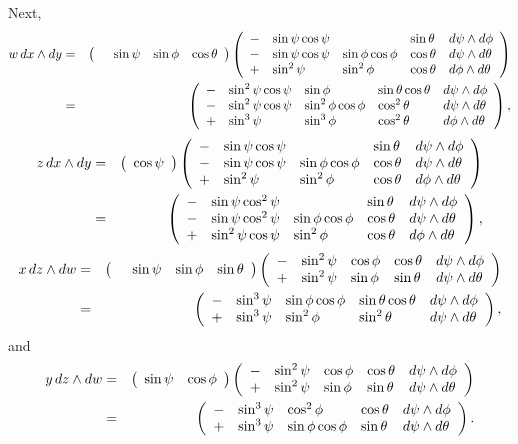 \documentclass[10pt]{article}
\numberwithin{equation}{subsection}
\begin{document}
Next,
\begin{eqnarray*}
	w\, dx\wedge dy &=&
		\left(\begin{array}{llllllllllll} 
			&\sin\psi &\sin\phi &\cos\theta
		 \end{array}\right)
		\left(\begin{array}{llllllllllll} 
			-& \sin\psi \cos\psi &                 &\sin\theta &d\psi\wedge d\phi \\
			-& \sin\psi \cos\psi &\sin\phi\cos\phi &\cos\theta &d\psi\wedge d\theta\\
			+& \sin^2\psi        &\sin^2\phi       &\cos\theta &d\phi\wedge d\theta
		 \end{array}\right) \\
	&=& \left(\begin{array}{llllllllllll} 
		-& \sin^2\psi \cos\psi & \sin\phi           &\sin\theta\cos\theta &d\psi\wedge d\phi \\
		-& \sin^2\psi \cos\psi & \sin^2\phi\cos\phi &\cos^2\theta         &d\psi\wedge d\theta \\
		+& \sin^3\psi          & \sin^3\phi         &\cos^2\theta         &d\phi\wedge d\theta
		 \end{array}\right),
\end{eqnarray*}
\begin{eqnarray*}
	z\, dx\wedge dy
	&=& \left(\begin{array}{llllllllllll} 
		\cos\psi
	 \end{array}\right)
	\left(\begin{array}{llllllllllll} 
		-& \sin\psi \cos\psi &                 &\sin\theta &d\psi \wedge d\phi \\
		-& \sin\psi \cos\psi &\sin\phi\cos\phi &\cos\theta &d\psi\wedge d\theta \\
		+& \sin^2\psi        &\sin^2\phi       &\cos\theta &d\phi\wedge d\theta
	 \end{array}\right) \\
	&=& \left(\begin{array}{llllllllllll} 
		-& \sin\psi\cos^2\psi &                 &\sin\theta &d\psi \wedge d\phi \\
		-& \sin\psi\cos^2\psi &\sin\phi\cos\phi &\cos\theta &d\psi\wedge d\theta \\
		+& \sin^2\psi\cos\psi &\sin^2\phi       &\cos\theta &d\phi\wedge d\theta
	 \end{array}\right),
\end{eqnarray*}
\begin{eqnarray*}
	x\,dz \wedge dw
	&=& \left(\begin{array}{llllllllllll} 
			&\sin\psi &\sin\phi &\sin\theta
		 \end{array}\right)
		\left(\begin{array}{llllllllllll} 
			-& \sin^2\psi &\cos\phi &\cos\theta &d\psi \wedge d\phi \\
			+& \sin^2\psi &\sin\phi &\sin\theta &d\psi \wedge d\theta
		 \end{array}\right) \\
	&=& \left(\begin{array}{llllllllllll} 
		-& \sin^3\psi &\sin\phi\cos\phi &\sin\theta\cos\theta &d\psi\wedge d\phi \\
		+& \sin^3\psi &\sin^2\phi       &\sin^2\theta         &d\psi \wedge d\theta
		 \end{array}\right),
\end{eqnarray*}
and
\begin{eqnarray*}
	y\, dz \wedge dw
	&=& \left(\begin{array}{llllllllllll} 
			\sin\psi&\cos\phi
		 \end{array}\right)
	\left(\begin{array}{llllllllllll} 
		-& \sin^2\psi &\cos\phi &\cos\theta &d\psi \wedge d\phi \\
		+& \sin^2\psi &\sin\phi &\sin\theta &d\psi \wedge d\theta
	 \end{array}\right) \\
	&=& \left(\begin{array}{llllllllllll} 
		-& \sin^3\psi &\cos^2\phi       &\cos\theta &d\psi \wedge d\phi \\
		+& \sin^3\psi &\sin\phi\cos\phi &\sin\theta &d\psi \wedge d\theta
	 \end{array}\right).
\end{eqnarray*}
\end{document}

